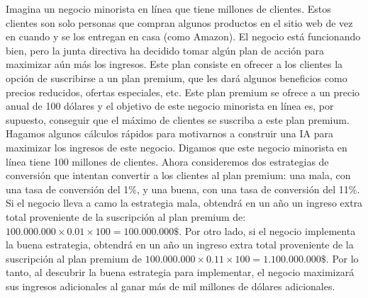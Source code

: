 \documentclass[]{book}
\begin{document}
Imagina un negocio minorista en línea que tiene millones de clientes. Estos clientes son solo personas que compran algunos productos en el sitio web de vez en cuando y se los entregan en casa (como Amazon). El negocio está funcionando bien, pero la junta directiva ha decidido tomar algún plan de acción para maximizar aún más los ingresos. Este plan consiste en ofrecer a los clientes la opción de suscribirse a un plan premium, que les dará algunos beneficios como precios reducidos, ofertas especiales, etc. Este plan premium se ofrece a un precio anual de 100 dólares y el objetivo de este negocio minorista en línea es, por supuesto, conseguir que el máximo de clientes se suscriba a este plan premium. Hagamos algunos cálculos rápidos para motivarnos a construir una IA para maximizar los ingresos de este negocio. Digamos que este negocio minorista en línea tiene 100 millones de clientes. Ahora consideremos dos estrategias de conversión que intentan convertir a los clientes al plan premium: una mala, con una tasa de conversión del 1\%, y una buena, con una tasa de conversión del 11\%. Si el negocio lleva a camo la estrategia mala, obtendrá en un año un ingreso extra total proveniente de la suscripción al plan premium de: \(100.000.000 \times 0.01 \times 100 = 100.000.000\$\). Por otro lado, si el negocio implementa la buena estrategia, obtendrá en un año un ingreso extra total proveniente de la suscripción al plan premium de \(100.000.000 \times 0.11 \times 100 = 1.100.000.000\$\). Por lo tanto, al descubrir la buena estrategia para implementar, el negocio maximizará sus ingresos adicionales al ganar más de mil millones de dólares adicionales.
\end{document}
